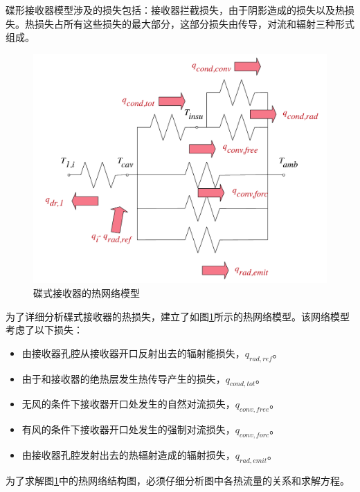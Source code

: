 碟形接收器模型涉及的损失包括：接收器拦截损失，由于阴影造成的损失以及热损失。热损失占所有这些损失的最大部分，这部分损失由传导，对流和辐射三种形式组成。
\noindent \begin{figure}[ht!]
\begin{center}
	\includegraphics[width = 0.5\columnwidth]{fig/thermalLosses.pdf}
	\caption{碟式接收器的热网络模型}
	\label{fig:thermal-lose}
\end{center}
\end{figure}
为了详细分析碟式接收器的热损失，建立了如图\ref{fig:thermal-lose}所示的热网络模型。该网络模型考虑了以下损失：
\begin{itemize}
	\item 由接收器孔腔从接收器开口反射出去的辐射能损失，$q_{rad,ref}$。
	\item 由于和接收器的绝热层发生热传导产生的损失，$q_{cond,tot}$。
	\item 无风的条件下接收器开口处发生的自然对流损失，$q_{conv,free}$。
	\item 有风的条件下接收器开口处发生的强制对流损失，$q_{conv,forc}$。
	\item 由接收器孔腔发射出去的热辐射造成的辐射损失，$q_{rad,emit}$。
\end{itemize}

为了求解图\ref{fig:thermal-lose}中的热网络结构图，必须仔细分析图中各热流量的关系和求解方程。

